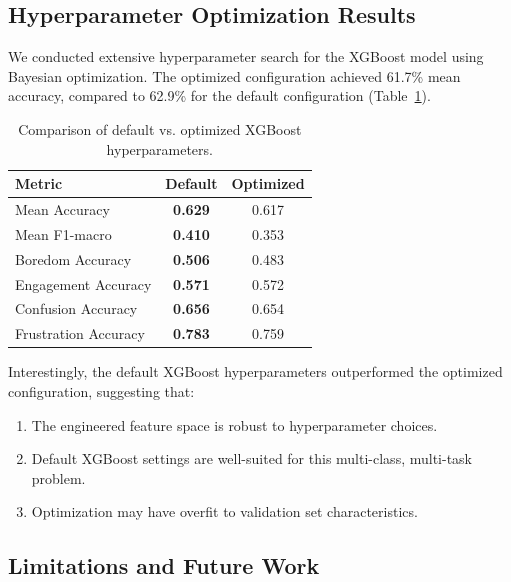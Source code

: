 \subsection{Hyperparameter Optimization Results}
\label{subsec:hyperparameter-results}

We conducted extensive hyperparameter search for the XGBoost model using Bayesian optimization. The optimized configuration achieved 61.7\% mean accuracy, compared to 62.9\% for the default configuration (Table~\ref{tab:hyperparameter-comparison}).

\begin{table}[t]
\centering
\caption{Comparison of default vs. optimized XGBoost hyperparameters.}
\label{tab:hyperparameter-comparison}
\begin{tabular}{lcc}
\toprule
\textbf{Metric} & \textbf{Default} & \textbf{Optimized} \\
\midrule
Mean Accuracy & \textbf{0.629} & 0.617 \\
Mean F1-macro & \textbf{0.410} & 0.353 \\
Boredom Accuracy & \textbf{0.506} & 0.483 \\
Engagement Accuracy & \textbf{0.571} & 0.572 \\
Confusion Accuracy & \textbf{0.656} & 0.654 \\
Frustration Accuracy & \textbf{0.783} & 0.759 \\
\bottomrule
\end{tabular}
\end{table}

Interestingly, the default XGBoost hyperparameters outperformed the optimized configuration, suggesting that:
\begin{enumerate}
    \item The engineered feature space is robust to hyperparameter choices.
    \item Default XGBoost settings are well-suited for this multi-class, multi-task problem.
    \item Optimization may have overfit to validation set characteristics.
\end{enumerate}

\subsection{Limitations and Future Work}
\label{subsec:limitations}

